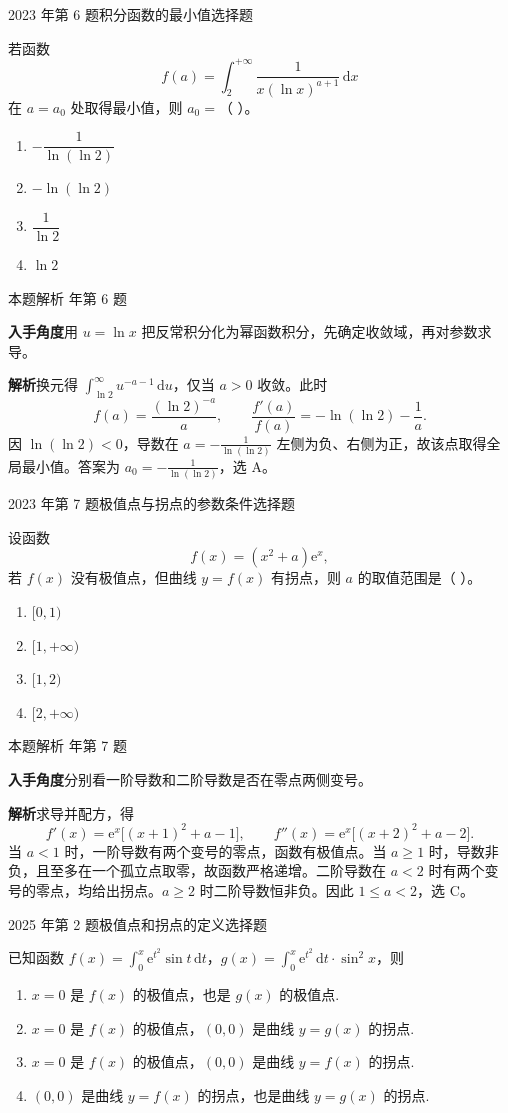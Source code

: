\documentclass[UTF8,zihao=-4,fontset=fandol]{ctexart}
\newenvironment{abcd}{\begin{enumerate}[label=\textup{(\Alph*)},leftmargin=2.3em,itemsep=1pt,topsep=4pt,parsep=1pt]}{\end{enumerate}}
\newcommand{\choices}[4]{%
  \begin{abcd}
    \item #1
    \item #2
    \item #3
    \item #4
  \end{abcd}}
\newcommand{\QuestionPage}[6]{%
  \par\noindent\begin{minipage}{\linewidth}
  \raggedright
  {\small\textcolor{black!60}{#3\quad #5}\hfill\textcolor{accent}{#2}}\par\smallskip}
\newcommand{\QuestionEnd}{\end{minipage}\par\medskip}
\newcommand{\QuestionPage}[6]{%
  \clearpage
  {\small\textcolor{accent}{#1\hfill #2}}\par\medskip
  {\small\textcolor{black!60}{#3\quad #5\hfill #6}}\par\vspace{9bp}}
\newcommand{\QuestionEnd}{}
\newenvironment{QuestionSolution}[1]{%
  \clearpage
  {\small\textcolor{black!60}{本题解析\quad #1}}\par\medskip
}{\par\clearpage}
\begin{document}
\QuestionPage{2.6 函数性态的研究}{选择题}{2023 年第 6 题}{1}{积分函数的最小值}{113 / 234}
若函数
\[f(a)=\int_2^{+\infty}\frac{1}{x(\ln x)^{a+1}}\,\mathrm{d}x
\]
在 \(a=a_0\) 处取得最小值，则 \(a_0=\)（ ）。
\choices{\(-\dfrac{1}{\ln(\ln 2)}\)}{\(-\ln(\ln 2)\)}{\(\dfrac{1}{\ln 2}\)}{\(\ln 2\)}
\QuestionEnd

\begin{QuestionSolution}{2023 年第 6 题}
\textbf{入手角度}\quad 用 \(u=\ln x\) 把反常积分化为幂函数积分，先确定收敛域，再对参数求导。

\textbf{解析}\quad 换元得 \(\int_{\ln2}^{\infty}u^{-a-1}\,\mathrm{d}u\)，仅当 \(a>0\) 收敛。此时
\[
f(a)=\frac{(\ln2)^{-a}}a,\qquad
\frac{f'(a)}{f(a)}=-\ln(\ln2)-\frac1a.
\]
因 \(\ln(\ln2)<0\)，导数在 \(a=-\frac{1}{\ln(\ln2)}\) 左侧为负、右侧为正，故该点取得全局最小值。答案为 \(\boxed{a_0=-\frac{1}{\ln(\ln2)}}\)，选 A。
\end{QuestionSolution}

\QuestionPage{2.6 函数性态的研究}{选择题}{2023 年第 7 题}{2}{极值点与拐点的参数条件}{114 / 234}
设函数
\[f(x)=(x^2+a)\mathrm{e}^x,
\]
若 \(f(x)\) 没有极值点，但曲线 \(y=f(x)\) 有拐点，则 \(a\) 的取值范围是（ ）。
\choices{\([0,1)\)}{\([1,+\infty)\)}{\([1,2)\)}{\([2,+\infty)\)}
\QuestionEnd

\begin{QuestionSolution}{2023 年第 7 题}
\textbf{入手角度}\quad 分别看一阶导数和二阶导数是否在零点两侧变号。

\textbf{解析}\quad 求导并配方，得
\[
f'(x)=\mathrm{e}^x\bigl[(x+1)^2+a-1\bigr],\qquad
f''(x)=\mathrm{e}^x\bigl[(x+2)^2+a-2\bigr].
\]
当 \(a<1\) 时，一阶导数有两个变号的零点，函数有极值点。当 \(a\ge1\) 时，导数非负，且至多在一个孤立点取零，故函数严格递增。二阶导数在 \(a<2\) 时有两个变号的零点，均给出拐点。\(a\ge2\) 时二阶导数恒非负。因此 \(1\le a<2\)，选 C。
\end{QuestionSolution}

\QuestionPage{2.6 函数性态的研究}{选择题}{2025 年第 2 题}{1}{极值点和拐点的定义}{115 / 234}
已知函数 \(f\left( x \right) = \int_{0}^{x} \mathrm{e}^{t^{2}} \sin t \,\mathrm{d} t\)，\(g\left( x \right) = \int_{0}^{x} \mathrm{e}^{t^{2}} \,\mathrm{d} t \cdot \sin^{2} x\)，则
\choices{\(x = 0\) 是 \(f\left( x \right)\) 的极值点，也是 \(g\left( x \right)\) 的极值点.}{\(x = 0\) 是 \(f\left( x \right)\) 的极值点，\(\left( 0, 0 \right)\) 是曲线 \(y = g\left( x \right)\) 的拐点.}{\(x = 0\) 是 \(f\left( x \right)\) 的极值点，\(\left( 0, 0 \right)\) 是曲线 \(y = f\left( x \right)\) 的拐点.}{\(\left( 0, 0 \right)\) 是曲线 \(y = f\left( x \right)\) 的拐点，也是曲线 \(y = g\left( x \right)\) 的拐点.}
\QuestionEnd
\end{document}
